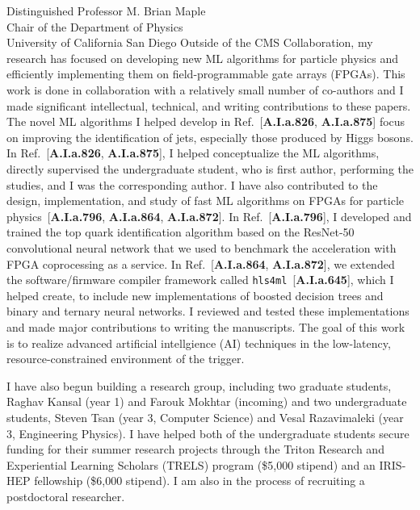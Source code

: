 \documentclass[ucsd,cs,11pt]{ucletter}
\begin{document}
\begin{letter}{
  Distinguished Professor M. Brian Maple\\
  Chair of the Department of Physics\\
  University of California San Diego
}
Outside of the CMS Collaboration, my research has focused on developing new ML algorithms for particle physics and efficiently implementing them on field-programmable gate arrays (FPGAs).
This work is done in collaboration with a relatively small number of co-authors and I made significant intellectual, technical, and writing contributions to these papers.
The novel ML algorithms I helped develop in Ref.~[\textbf{A.I.a.826}, \textbf{A.I.a.875}] focus on improving the identification of jets, especially those produced by Higgs bosons.
In Ref.~[\textbf{A.I.a.826}, \textbf{A.I.a.875}], I helped conceptualize the ML algorithms, directly supervised the undergraduate student, who is first author, performing the studies, and I was the corresponding author.
I have also contributed to the design, implementation, and study of fast ML algorithms on FPGAs for particle physics~[\textbf{A.I.a.796}, \textbf{A.I.a.864}, \textbf{A.I.a.872}].
In Ref.~[\textbf{A.I.a.796}], I developed and trained the top quark identification algorithm based on the ResNet-50 convolutional neural network that we used to benchmark the acceleration with FPGA coprocessing as a service.
In Ref.~[\textbf{A.I.a.864}, \textbf{A.I.a.872}], we extended the software/firmware compiler framework called \texttt{hls4ml}~[\textbf{A.I.a.645}], which I helped create, to include new implementations of boosted decision trees and binary and ternary neural networks.
I reviewed and tested these implementations and made major contributions to writing the manuscripts.
The goal of this work is to realize advanced artificial intellgience (AI) techniques in the low-latency, resource-constrained environment of the trigger.

I have also begun building a research group, including two graduate students, Raghav Kansal (year 1) and Farouk Mokhtar (incoming) and two undergraduate students, Steven Tsan (year 3, Computer Science) and Vesal Razavimaleki (year 3, Engineering Physics).
I have helped both of the undergraduate students secure funding for their summer research projects through the Triton Research and Experiential Learning Scholars (TRELS) program (\$5,000 stipend) and an IRIS-HEP fellowship (\$6,000 stipend).
I am also in the process of recruiting a postdoctoral researcher.


\end{letter}
\end{document}
